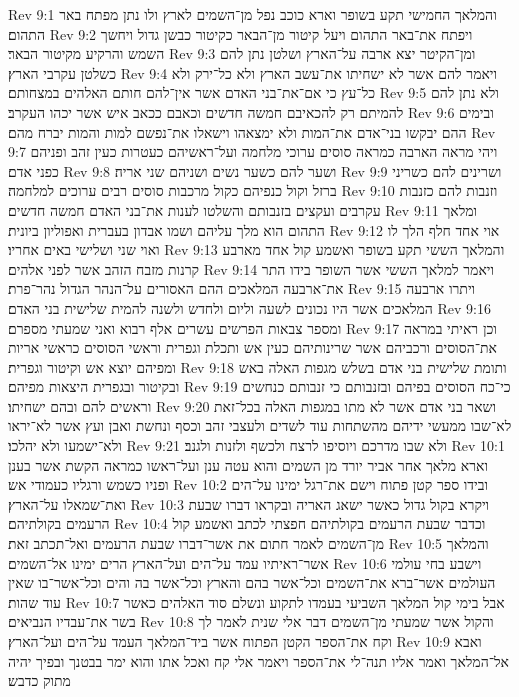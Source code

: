 Rev 9:1  והמלאך החמישי תקע בשופר וארא כוכב נפל מן־השמים לארץ ולו נתן מפתח באר התהום׃
Rev 9:2  ויפתח את־באר התהום ויעל קיטור מן־הבאר כקיטור כבשן גדול ויחשך השמש והרקיע מקיטור הבאר׃
Rev 9:3  ומן־הקיטר יצא ארבה על־הארץ ושלטן נתן להם כשלטן עקרבי הארץ׃
Rev 9:4  ויאמר להם אשר לא ישחיתו את־עשב הארץ ולא כל־ירק ולא כל־עץ כי אם־את־בני האדם אשר אין־להם חותם האלהים במצחותם׃
Rev 9:5  ולא נתן להם להמיתם רק להכאיבם חמשה חדשים וכאבם ככאב איש אשר יכהו העקרב׃
Rev 9:6  ובימים ההם יבקשו בני־אדם את־המות ולא ימצאהו וישאלו את־נפשם למות והמות יברח מהם׃
Rev 9:7  ויהי מראה הארבה כמראה סוסים ערוכי מלחמה ועל־ראשיהם כעטרות כעין זהב ופניהם כפני אדם׃
Rev 9:8  ושער להם כשער נשים ושניהם שני אריה׃
Rev 9:9  ושרינים להם כשריני ברזל וקול כנפיהם כקול מרכבות סוסים רבים ערוכים למלחמה׃
Rev 9:10  וזנבות להם כזנבות עקרבים ועקצים בזנבותם והשלטו לענות את־בני האדם חמשה חדשים׃
Rev 9:11  ומלאך התהום הוא מלך עליהם ושמו אבדון בעברית ואפוליון ביונית׃
Rev 9:12  אוי אחד חלף הלך לו ואוי שני ושלישי באים אחריו׃
Rev 9:13  והמלאך הששי תקע בשופר ואשמע קול אחד מארבע קרנות מזבח הזהב אשר לפני אלהים׃
Rev 9:14  ויאמר למלאך הששי אשר השופר בידו התר את־ארבעה המלאכים ההם האסורים על־הנהר הגדול נהר־פרת׃
Rev 9:15  ויתרו ארבעה המלאכים אשר היו נכונים לשעה וליום ולחדש ולשנה להמית שלישית בני האדם׃
Rev 9:16  ומספר צבאות הפרשים עשרים אלף רבוא ואני שמעתי מספרם׃
Rev 9:17  וכן ראיתי במראה את־הסוסים ורכביהם אשר שרינותיהם כעין אש ותכלת וגפרית וראשי הסוסים כראשי אריות ומפיהם יוצא אש וקיטור וגפרית׃
Rev 9:18  ותומת שלישית בני אדם בשלש מגפות האלה באש ובקיטור ובגפרית היצאות מפיהם׃
Rev 9:19  כי־כח הסוסים בפיהם ובזנבותם כי זנבותם כנחשים וראשים להם ובהם ישחיתו׃
Rev 9:20  ושאר בני אדם אשר לא מתו במגפות האלה בכל־זאת לא־שבו ממעשי ידיהם מהשתחות עוד לשדים ולעצבי זהב וכסף ונחשת ואבן ועץ אשר לא־יראו ולא־ישמעו ולא יהלכו׃
Rev 9:21  ולא שבו מדרכם ויוסיפו לרצח ולכשף ולזנות ולגנב׃
Rev 10:1  וארא מלאך אחר אביר יורד מן השמים והוא עטה ענן ועל־ראשו כמראה הקשת אשר בענן ופניו כשמש ורגליו כעמודי אש׃
Rev 10:2  ובידו ספר קטן פתוח וישם את־רגל ימינו על־הים ואת־שמאלו על־הארץ׃
Rev 10:3  ויקרא בקול גדול כאשר ישאג האריה ובקראו דברו שבעת הרעמים בקולתיהם׃
Rev 10:4  וכדבר שבעת הרעמים בקולתיהם חפצתי לכתב ואשמע קול מן־השמים לאמר חתום את אשר־דברו שבעת הרעמים ואל־תכתב זאת׃
Rev 10:5  והמלאך אשר־ראיתיו עמד על־הים ועל־הארץ הרים ימינו אל־השמים׃
Rev 10:6  וישבע בחי עולמי העולמים אשר־ברא את־השמים וכל־אשר בהם והארץ וכל־אשר בה והים וכל־אשר־בו שאין עוד שהות׃
Rev 10:7  אבל בימי קול המלאך השביעי בעמדו לתקוע ונשלם סוד האלהים כאשר בשר את־עבדיו הנביאים׃
Rev 10:8  והקול אשר שמעתי מן־השמים דבר אלי שנית לאמר לך וקח את־הספר הקטן הפתוח אשר ביד־המלאך העמד על־הים ועל־הארץ׃
Rev 10:9  ואבא אל־המלאך ואמר אליו תנה־לי את־הספר ויאמר אלי קח ואכל אתו והוא ימר בבטנך ובפיך יהיה מתוק כדבש׃
